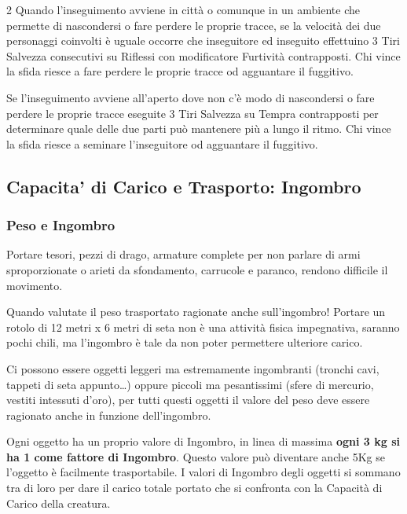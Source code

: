 \begin{multicols}{2}
Quando l'inseguimento avviene in città o comunque in un ambiente che permette di nascondersi o fare perdere le proprie tracce, se la velocità dei due personaggi coinvolti è uguale occorre che inseguitore ed inseguito effettuino 3 Tiri Salvezza consecutivi su Riflessi con modificatore Furtività contrapposti. Chi vince la sfida riesce a fare perdere le proprie tracce od agguantare il fuggitivo.

Se l'inseguimento avviene all'aperto dove non c'è modo di nascondersi o fare perdere le proprie tracce eseguite 3 Tiri Salvezza su Tempra contrapposti per determinare quale delle due parti può mantenere più a lungo il ritmo. Chi vince la sfida riesce a seminare l'inseguitore od agguantare il fuggitivo.

\subsection{Capacita' di Carico e Trasporto: Ingombro}\hypertarget{ingombro}{}\label{ingombro}

\label{sec:capacita-di-carico-e-trasporto-ingombro}

\subsubsection{Peso e Ingombro}

Portare tesori, pezzi di drago, armature complete per non parlare di armi sproporzionate o arieti da sfondamento, carrucole e paranco, rendono difficile il movimento.

Quando valutate il peso trasportato ragionate anche sull'ingombro!
Portare un rotolo di 12 metri x 6 metri di seta non è una attività fisica impegnativa, saranno pochi chili, ma l'ingombro è tale da non poter permettere ulteriore carico.

Ci possono essere oggetti leggeri ma estremamente ingombranti (tronchi cavi, tappeti di seta appunto…) oppure piccoli ma pesantissimi (sfere di mercurio, vestiti intessuti d'oro), per tutti questi oggetti il valore del peso deve essere ragionato anche in funzione dell'ingombro.

Ogni oggetto ha un proprio valore di Ingombro, in linea di massima \textbf{ogni 3 kg si ha 1 come fattore di Ingombro}. Questo valore può diventare anche 5Kg se l'oggetto è facilmente trasportabile. I valori di Ingombro degli oggetti si sommano tra di loro per dare il carico totale portato che si confronta con la Capacità di Carico della creatura.


\end{multicols}
